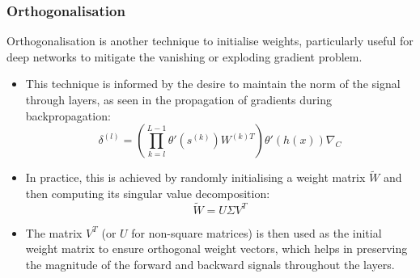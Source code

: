 \subsubsection*{Orthogonalisation}
Orthogonalisation is another technique to initialise weights, particularly useful for deep networks to mitigate the vanishing or exploding gradient problem.
\begin{itemize}
    \item This technique is informed by the desire to maintain the norm of the signal through layers, as seen in the propagation of gradients during backpropagation:
    \begin{equation}
        \delta^{(l)} = \left(\prod_{k=l}^{L-1} \theta'(s^{(k)})W^{(k)T}\right) \theta'(h(x))\nabla_{\!C}
    \end{equation}
    \item In practice, this is achieved by randomly initialising a weight matrix \(\widetilde{W}\) and then computing its singular value decomposition:
    \begin{equation}
        \widetilde{W} = U \Sigma V^T
    \end{equation}
    \item The matrix \(V^T\) (or \(U\) for non-square matrices) is then used as the initial weight matrix to ensure orthogonal weight vectors, which helps in preserving the magnitude of the forward and backward signals throughout the layers.
\end{itemize}



